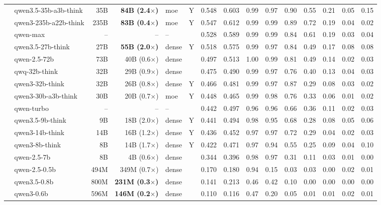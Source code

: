 \begin{longtable}{@{}ll r r l c rr rrrrrrr@{}}
 & qwen3.5-35b-a3b-think & 35B & \textbf{84B (2.4$\times$)} & moe & Y & 0.548 & 0.603 & 0.99 & 0.97 & 0.90 & 0.55 & 0.21 & 0.05 & 0.15 \\
 & qwen3-235b-a22b-think & 235B & \textbf{83B (0.4$\times$)} & moe & Y & 0.547 & 0.612 & 0.99 & 0.99 & 0.89 & 0.72 & 0.19 & 0.04 & 0.02 \\
 & qwen-max & -- & -- & -- &  & 0.528 & 0.589 & 0.99 & 0.99 & 0.84 & 0.61 & 0.19 & 0.03 & 0.04 \\
 & qwen3.5-27b-think & 27B & \textbf{55B (2.0$\times$)} & dense & Y & 0.518 & 0.575 & 0.99 & 0.97 & 0.84 & 0.49 & 0.17 & 0.08 & 0.08 \\
 & qwen-2.5-72b & 73B & 40B (0.6$\times$) & dense &  & 0.497 & 0.513 & 1.00 & 0.99 & 0.81 & 0.49 & 0.14 & 0.02 & 0.03 \\
 & qwq-32b-think & 32B & 29B (0.9$\times$) & dense &  & 0.475 & 0.490 & 0.99 & 0.97 & 0.76 & 0.40 & 0.13 & 0.04 & 0.03 \\
 & qwen3-32b-think & 32B & 26B (0.8$\times$) & dense & Y & 0.466 & 0.481 & 0.99 & 0.97 & 0.87 & 0.29 & 0.08 & 0.03 & 0.02 \\
 & qwen3-30b-a3b-think & 30B & 20B (0.7$\times$) & moe & Y & 0.448 & 0.465 & 0.99 & 0.98 & 0.76 & 0.33 & 0.06 & 0.01 & 0.02 \\
 & qwen-turbo & -- & -- & -- &  & 0.442 & 0.497 & 0.96 & 0.96 & 0.66 & 0.36 & 0.11 & 0.02 & 0.03 \\
 & qwen3.5-9b-think & 9B & 18B (2.0$\times$) & dense & Y & 0.441 & 0.494 & 0.98 & 0.95 & 0.68 & 0.28 & 0.08 & 0.05 & 0.06 \\
 & qwen3-14b-think & 14B & 16B (1.2$\times$) & dense & Y & 0.436 & 0.452 & 0.97 & 0.97 & 0.72 & 0.29 & 0.04 & 0.02 & 0.03 \\
 & qwen3-8b-think & 8B & 14B (1.7$\times$) & dense & Y & 0.422 & 0.471 & 0.97 & 0.94 & 0.55 & 0.25 & 0.09 & 0.04 & 0.10 \\
 & qwen-2.5-7b & 8B & 4B (0.6$\times$) & dense &  & 0.344 & 0.396 & 0.98 & 0.97 & 0.31 & 0.11 & 0.03 & 0.01 & 0.00 \\
 & qwen-2.5-0.5b & 494M & 349M (0.7$\times$) & dense &  & 0.170 & 0.180 & 0.94 & 0.15 & 0.03 & 0.03 & 0.00 & 0.02 & 0.01 \\
 & qwen3.5-0.8b & 800M & \textbf{231M (0.3$\times$)} & dense &  & 0.141 & 0.213 & 0.46 & 0.42 & 0.10 & 0.00 & 0.00 & 0.00 & 0.00 \\
 & qwen3-0.6b & 596M & \textbf{146M (0.2$\times$)} & dense &  & 0.110 & 0.116 & 0.47 & 0.20 & 0.05 & 0.01 & 0.01 & 0.02 & 0.01 \\

\end{longtable}
